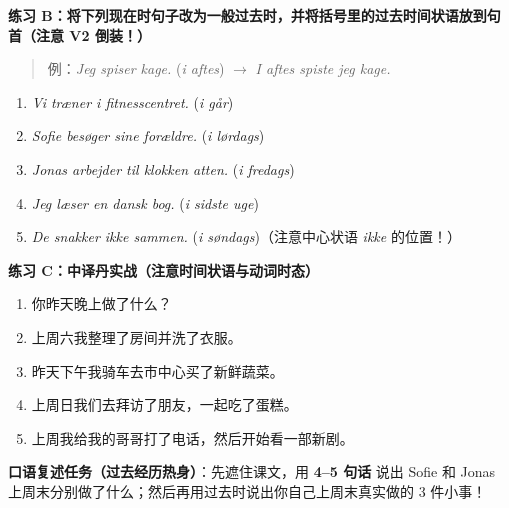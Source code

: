 \textbf{练习 B：将下列现在时句子改为一般过去时，并将括号里的过去时间状语放到句首（注意 V2 倒装！）}
\begin{quote}
\small 例：\textit{Jeg spiser kage.} (\textit{i aftes}) $\rightarrow$ \textit{I aftes spiste jeg kage.}
\end{quote}
\begin{enumerate}
  \item \textit{Vi træner i fitnesscentret.} (\textit{i går})
  \item \textit{Sofie besøger sine forældre.} (\textit{i lørdags})
  \item \textit{Jonas arbejder til klokken atten.} (\textit{i fredags})
  \item \textit{Jeg læser en dansk bog.} (\textit{i sidste uge})
  \item \textit{De snakker ikke sammen.} (\textit{i søndags})（注意中心状语 \textit{ikke} 的位置！）
\end{enumerate}

\textbf{练习 C：中译丹实战（注意时间状语与动词时态）}
\begin{enumerate}
  \item 你昨天晚上做了什么？
  \item 上周六我整理了房间并洗了衣服。
  \item 昨天下午我骑车去市中心买了新鲜蔬菜。
  \item 上周日我们去拜访了朋友，一起吃了蛋糕。
  \item 上周我给我的哥哥打了电话，然后开始看一部新剧。
\end{enumerate}


\textbf{口语复述任务（过去经历热身）}：先遮住课文，用 \textbf{4--5 句话} 说出 Sofie 和 Jonas 上周末分别做了什么；然后再用过去时说出你自己上周末真实做的 3 件小事！

